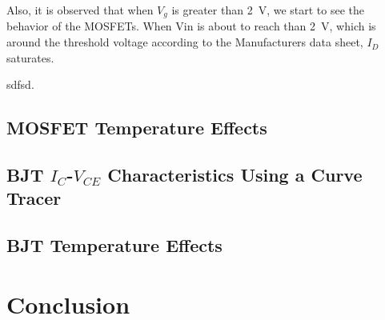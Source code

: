 \documentclass[journal]{IEEEtran}
\begin{document}
\par Also, it is observed that when $V_{g}$ is greater than \SI{2}{\volt},
we start to see the behavior of the MOSFETs. When Vin is about to reach than
\SI{2}{\volt}, which is around the  threshold voltage according to the Manufacturers data sheet,
$I_{D}$ saturates.
\par sdfsd.

\subsection{MOSFET Temperature Effects}
\subsection{BJT $I_{C}$-$V_{CE}$ Characteristics Using a Curve Tracer}
\subsection{BJT Temperature Effects}
\section{Conclusion}
\end{document}

